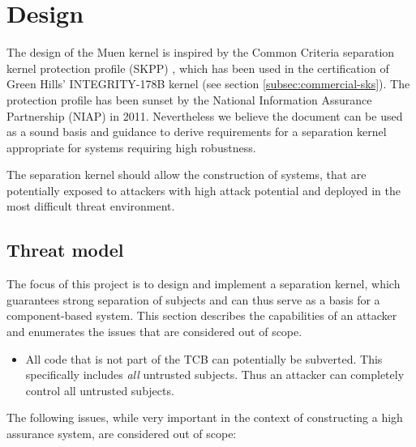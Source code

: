 \chapter{Design}
The design of the Muen kernel is inspired by the Common Criteria separation
kernel protection profile (SKPP) \cite{SKPP}, which has been used in the
certification of Green Hills' INTEGRITY-178B kernel (see section
\ref{subsec:commercial-sks}). The protection profile has been sunset by the
National Information Assurance Partnership (NIAP) in 2011. Nevertheless we
believe the document can be used as a sound basis and guidance to derive
requirements for a separation kernel appropriate for systems requiring high
robustness.

The separation kernel should allow the construction of systems, that are
potentially exposed to attackers with high attack potential and deployed in the
most difficult threat environment.

\section{Threat model}
The focus of this project is to design and implement a separation kernel, which
guarantees strong separation of subjects and can thus serve as a basis for a
component-based system. This section describes the capabilities of an attacker
and enumerates the issues that are considered out of scope.

\begin{itemize}
	\item All code that is not part of the TCB can potentially be subverted.
		This specifically includes \emph{all} untrusted subjects. Thus an
		attacker can completely control all untrusted subjects.
\end{itemize}

The following issues, while very important in the context of constructing a
high assurance system, are considered out of scope:


